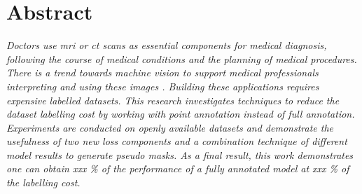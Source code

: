 \chapter*{Abstract}

\begin{multicols}{2}
\thispagestyle{plain}
\par{
    \textit{
        Doctors use \acrfull{mri} or \acrfull{ct} scans as essential components for medical diagnosis, following the course of medical conditions and the planning of medical procedures.
        There is a trend towards machine vision to support medical professionals interpreting and using these images .
        Building these applications requires expensive labelled datasets.
        This research investigates techniques to reduce the dataset labelling cost by working with point annotation instead of full annotation.
        Experiments are conducted on openly available datasets and demonstrate the usefulness of two new loss components and a combination technique of different model results to generate pseudo masks.
        As a final result, this work demonstrates one can obtain xxx \% of the performance of a fully annotated model at xxx \% of the labelling cost. 
    }
}

\end{multicols}
